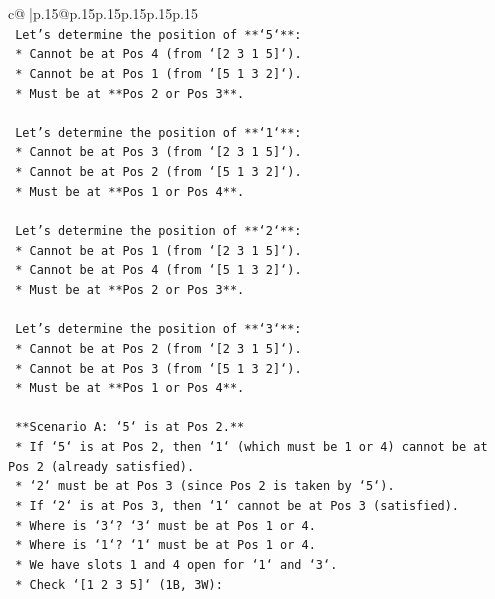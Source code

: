 \documentclass{article}
\begin{document}
{\begin{supertabular}{c@{$\;$}|p{.15\linewidth}@{}p{.15\linewidth}p{.15\linewidth}p{.15\linewidth}p{.15\linewidth}p{.15\linewidth}}
{{{\\ 
\texttt{    Let's determine the position of **`5`**:} \\
\texttt{    *   Cannot be at Pos 4 (from `{[}2 3 1 5{]}`).} \\
\texttt{    *   Cannot be at Pos 1 (from `{[}5 1 3 2{]}`).} \\
\texttt{    *   Must be at **Pos 2 or Pos 3**.} \\
\\ 
\texttt{    Let's determine the position of **`1`**:} \\
\texttt{    *   Cannot be at Pos 3 (from `{[}2 3 1 5{]}`).} \\
\texttt{    *   Cannot be at Pos 2 (from `{[}5 1 3 2{]}`).} \\
\texttt{    *   Must be at **Pos 1 or Pos 4**.} \\
\\ 
\texttt{    Let's determine the position of **`2`**:} \\
\texttt{    *   Cannot be at Pos 1 (from `{[}2 3 1 5{]}`).} \\
\texttt{    *   Cannot be at Pos 4 (from `{[}5 1 3 2{]}`).} \\
\texttt{    *   Must be at **Pos 2 or Pos 3**.} \\
\\ 
\texttt{    Let's determine the position of **`3`**:} \\
\texttt{    *   Cannot be at Pos 2 (from `{[}2 3 1 5{]}`).} \\
\texttt{    *   Cannot be at Pos 3 (from `{[}5 1 3 2{]}`).} \\
\texttt{    *   Must be at **Pos 1 or Pos 4**.} \\
\\ 
\texttt{    **Scenario A: `5` is at Pos 2.**} \\
\texttt{    *   If `5` is at Pos 2, then `1` (which must be 1 or 4) cannot be at Pos 2 (already satisfied).} \\
\texttt{    *   `2` must be at Pos 3 (since Pos 2 is taken by `5`).} \\
\texttt{    *   If `2` is at Pos 3, then `1` cannot be at Pos 3 (satisfied).} \\
\texttt{    *   Where is `3`? `3` must be at Pos 1 or 4.} \\
\texttt{    *   Where is `1`? `1` must be at Pos 1 or 4.} \\
\texttt{    *   We have slots 1 and 4 open for `1` and `3`.} \\
\texttt{    *   Check `{[}1 2 3 5{]}` (1B, 3W):} \\
}}}
\end{supertabular}}
\end{document}
